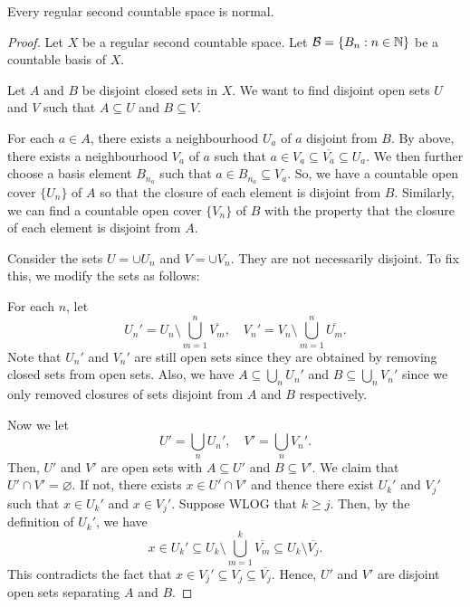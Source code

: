 \begin{theorem}
    Every regular second countable space is normal.
\end{theorem}
\begin{proof}
    Let $X$ be a regular second countable space. Let $\mathcal{B}=\{B_n:n\in\mathbb{N}\}$ be a countable basis of $X$. 

    Let $A$ and $B$ be disjoint closed sets in $X$. We want to find disjoint open sets $U$ and $V$ such that $A\subseteq U$ and $B\subseteq V$.

    For each $a\in A$, there exists a neighbourhood $U_a$ of $a$ disjoint from $B$. By  above, there exists a neighbourhood $V_a$ of $a$ such that $a\in V_a\subseteq \overline{V_a}\subseteq U_a$. We then further choose a basis element $B_{n_a}$ such that $a\in B_{n_a}\subseteq V_a$. So, we have a countable open cover $\{U_n\}$ of $A$ so that the closure of each element is disjoint from $B$. Similarly, we can find a countable open cover $\{V_n\}$ of $B$ with the property that the closure of each element is disjoint from $A$. 

    Consider the sets $U=\cup U_n$ and $V=\cup V_n$. They are not necessarily disjoint. To fix this, we modify the sets as follows:

    For each $n$, let
    \[U_n'=U_n\setminus \bigcup_{m=1}^{n} \overline{V_m},\quad V_n'=V_n\setminus \bigcup_{m=1}^{n} \overline{U_m}.\]
    Note that $U_n'$ and $V_n'$ are still open sets since they are obtained by removing closed sets from open sets. Also, we have $A\subseteq \bigcup_n U_n'$ and $B\subseteq \bigcup_n V_n'$ since we only removed closures of sets disjoint from $A$ and $B$ respectively.

    Now we let
    \[U'=\bigcup_n U_n',\quad V'=\bigcup_n V_n'.\]
    Then, $U'$ and $V'$ are open sets with $A\subseteq U'$ and $B\subseteq V'$. We claim that $U'\cap V'=\varnothing$. If not, there exists $x\in U'\cap V'$ and thence there exist $U_k'$ and $V_j'$ such that $x\in U_k'$ and $x\in V_j'$. Suppose WLOG that $k\ge j$. Then, by the definition of $U_k'$, we have
    \[x\in U_k'\subseteq U_k\setminus \bigcup_{m=1}^{k} \overline{V_m} \subseteq U_k\setminus \overline{V_j}.\]
    This contradicts the fact that $x\in V_j' \subseteq V_j \subseteq \overline{V_j}$.
     Hence, $U'$ and $V'$ are disjoint open sets separating $A$ and $B$.
\end{proof}

